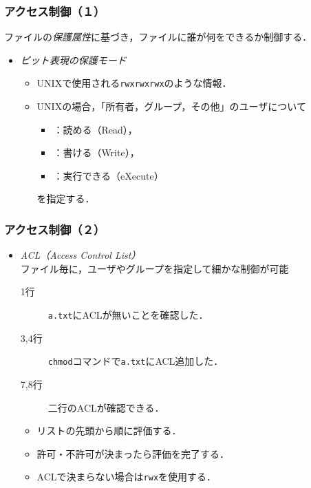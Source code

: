 \documentclass[unicode,handout]{beamer}                   %
\begin{document}
\begin{frame}
  \frametitle{アクセス制御（１）}
  \begin{minipage}{0.54\columnwidth}
  ファイルの\emph{保護属性}に基づき，ファイルに誰が何をできるか制御する．
  \begin{itemize}
  \item \emph{ビット表現の保護モード}\\
    \begin{itemize}
    \item UNIXで使用される\texttt{rwxrwxrwx}のような情報．
    \item UNIXの場合，「所有者，グループ，その他」のユーザについて\\
      \begin{itemize}
      \item[r]：読める（Read），
      \item[w]：書ける（Write），
      \item[x]：実行できる（eXecute）
      \end{itemize}
      を指定する．
    \end{itemize}
  \end{itemize}
  \end{minipage}
  \begin{minipage}{0.44\columnwidth}
  \end{minipage}
\end{frame}

\begin{frame}
  \frametitle{アクセス制御（２）}
  \begin{itemize}
  \item \emph{ACL（Access Control List）}\\
    ファイル毎に，ユーザやグループを指定して細かな制御が可能


    \begin{description}
    \item[1行] \texttt{a.txt}にACLが無いことを確認した．
    \item[3,4行] \texttt{chmod}コマンドで\texttt{a.txt}にACL追加した．
    \item[7,8行] 二行のACLが確認できる．
    \end{description}

    \begin{itemize}
    \item リストの先頭から順に評価する．
    \item 許可・不許可が決まったら評価を完了する．
    \item ACLで決まらない場合は\texttt{rwx}を使用する．
    \end{itemize}
  \end{itemize}
\end{frame}
\end{document}
